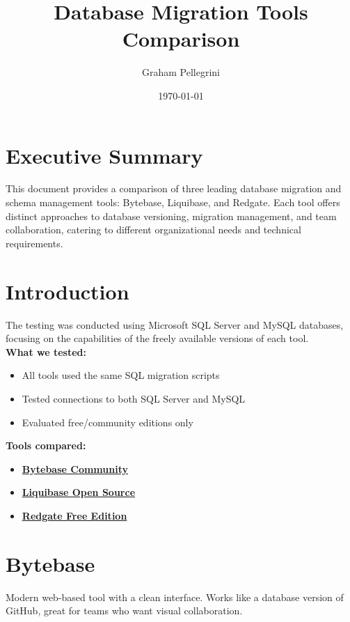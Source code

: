 \documentclass[11pt,a4paper]{article}
\title{Database Migration Tools Comparison}
\author{Graham Pellegrini}
\date{\today}
\begin{document}
\maketitle

\tableofcontents
\newpage

\section{Executive Summary}

This document provides a comparison of three leading database migration and schema management tools: Bytebase, Liquibase, and Redgate.
Each tool offers distinct approaches to database versioning, migration management, and team collaboration, catering to different organizational needs and technical requirements.

\section{Introduction}
The testing was conducted using Microsoft SQL Server and MySQL databases, focusing on the  capabilities of the freely available versions of each tool.\\
\textbf{What we tested:}
\begin{itemize}
    \item All tools used the same SQL migration scripts
    \item Tested connections to both SQL Server and MySQL
    \item Evaluated free/community editions only
\end{itemize}

\textbf{Tools compared:}
\begin{itemize}
    \item \href{https://bytebase.com}{\textbf{Bytebase Community}}
    \item \href{https://liquibase.org}{\textbf{Liquibase Open Source}}
    \item \href{https://www.red-gate.com/products/sql-development/sql-compare/}{\textbf{Redgate Free Edition}}
\end{itemize}

\newpage

\section{Bytebase}

Modern web-based tool with a clean interface.
Works like a database version of GitHub, great for teams who want visual collaboration.
\end{document}
